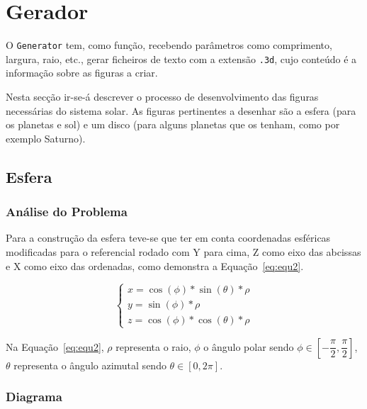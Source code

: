 \section{Gerador}

O \texttt{Generator} tem, como função, recebendo parâmetros como comprimento,
largura, raio, etc., gerar ficheiros de texto com a extensão \verb|.3d|, cujo conteúdo
é a informação sobre as figuras a criar. 

Nesta secção ir-se-á descrever o processo de desenvolvimento das figuras
necessárias do sistema solar. As figuras pertinentes a desenhar são a esfera
(para os planetas e sol) e um disco (para alguns planetas que os tenham, como
por exemplo Saturno). 



\subsection{Esfera}
\subsubsection{Análise do Problema}
Para a construção da esfera teve-se que ter em conta coordenadas esféricas
modificadas para o referencial rodado com Y para cima, Z como eixo das abcissas
e X como eixo das ordenadas, como demonstra a Equação~\ref{eq:equ2}.


\begin{equation}
    \begin{cases}
    x = \cos(\phi) * \sin(\theta) * \rho \\
    y = \sin(\phi) * \rho \\
    z = \cos(\phi) * \cos(\theta) *\rho
    \end{cases}
\label{eq:equ2}
\end{equation}

Na Equação~\ref{eq:equ2}, $\rho$ representa o raio, $\phi$ o ângulo polar sendo
$\phi \in [-\dfrac{\pi}{2}, \dfrac{\pi}{2}]$, $\theta$ representa o ângulo
azimutal sendo $\theta \in [0, 2\pi]$. 


\newpage
\subsubsection{Diagrama}


